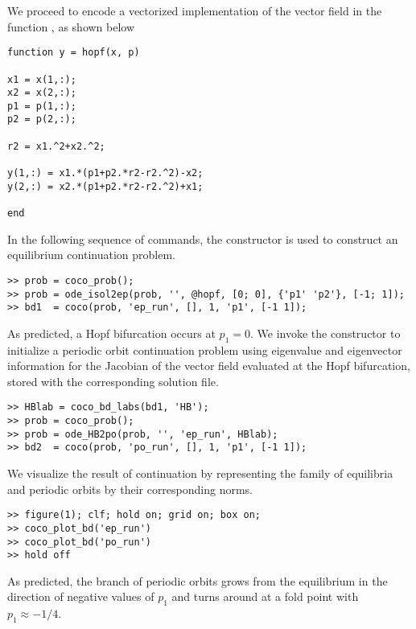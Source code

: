 We proceed to encode a vectorized implementation of the vector field in the function , as shown below
\begin{lstlisting}[language=coco-highlight]
function y = hopf(x, p)

x1 = x(1,:);
x2 = x(2,:);
p1 = p(1,:);
p2 = p(2,:);

r2 = x1.^2+x2.^2;

y(1,:) = x1.*(p1+p2.*r2-r2.^2)-x2;
y(2,:) = x2.*(p1+p2.*r2-r2.^2)+x1;

end
\end{lstlisting}
In the following sequence of commands, the  constructor is used to construct an equilibrium continuation problem.
\begin{lstlisting}[language=coco-highlight]
>> prob = coco_prob();
>> prob = ode_isol2ep(prob, '', @hopf, [0; 0], {'p1' 'p2'}, [-1; 1]);
>> bd1  = coco(prob, 'ep_run', [], 1, 'p1', [-1 1]);
\end{lstlisting}
As predicted, a Hopf bifurcation occurs at $p_1=0$. We invoke the  constructor to initialize a periodic orbit continuation problem using eigenvalue and eigenvector information for the Jacobian of the vector field evaluated at the Hopf bifurcation, stored with the corresponding solution file.
\begin{lstlisting}[language=coco-highlight]
>> HBlab = coco_bd_labs(bd1, 'HB');
>> prob = coco_prob();
>> prob = ode_HB2po(prob, '', 'ep_run', HBlab);
>> bd2  = coco(prob, 'po_run', [], 1, 'p1', [-1 1]);
\end{lstlisting}
We visualize the result of continuation by representing the family of equilibria and periodic orbits by their  corresponding norms.
\begin{lstlisting}[language=coco-highlight]
>> figure(1); clf; hold on; grid on; box on;
>> coco_plot_bd('ep_run')
>> coco_plot_bd('po_run')
>> hold off
\end{lstlisting}
As predicted, the branch of periodic orbits grows from the equilibrium in the direction of negative values of $p_1$ and turns around at a fold point with $p_1\approx -1/4$.\\
\medskip

